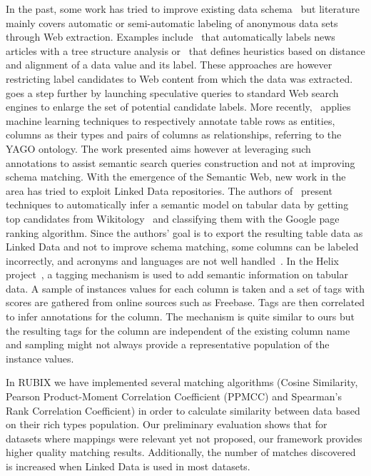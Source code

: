 \documentclass[onecolumn, crcready]{../../Util/LaTEX/iosart2c}
\begin{document}
In the past, some work has tried to improve existing data schema~\cite{Miller:IEEE:03} but literature mainly covers automatic or semi-automatic labeling of anonymous data sets through Web extraction. Examples include~\cite{Reis:WWW:04} that automatically labels news articles with a tree structure analysis or~\cite{Wang:WWW:03} that defines heuristics based on distance and alignment of a data value and its label. These approaches are however restricting label candidates to Web content from which the data was extracted.~\cite{DaSilva:OTM:07} goes a step further by launching speculative queries to standard Web search engines to enlarge the set of potential candidate labels. More recently,~\cite{Limaye:VLDB:10} applies machine learning techniques to respectively annotate table rows as entities, columns as their types and pairs of columns as relationships, referring to the YAGO ontology. The work presented aims however at leveraging such annotations to assist semantic search queries construction and not at improving schema matching.
With the emergence of the Semantic Web, new work in the area has tried to exploit Linked Data repositories. The authors of~\cite{Syed:WebSci:10} present techniques to automatically infer a semantic model on tabular data by getting top candidates from Wikitology~\cite{Finin:AAAI:09} and classifying them with the Google page ranking algorithm. Since the authors' goal is to export the resulting table data as Linked Data and not to improve schema matching, some columns can be labeled incorrectly, and acronyms and languages are not well handled~\cite{Syed:WebSci:10}. In the Helix project~\cite{Hassanzadeh:WWW:11}, a tagging mechanism is used to add semantic information on tabular data. A sample of instances values for each column is taken and a set of tags with scores are gathered from online sources such as Freebase. Tags are then correlated to infer annotations for the column. The mechanism is quite similar to ours but the resulting tags for the column are independent of the existing column name and sampling might not always provide a representative population of the instance values.

In RUBIX we have implemented several matching algorithms (Cosine Similarity, Pearson Product-Moment Correlation Coefficient (PPMCC) and Spearman's Rank Correlation Coefficient) in order to calculate similarity between data based on their rich types population. Our preliminary evaluation shows that for datasets where mappings were relevant yet not proposed, our framework provides higher quality matching results. Additionally, the number of matches discovered is increased when Linked Data is used in most datasets.
\end{document}
